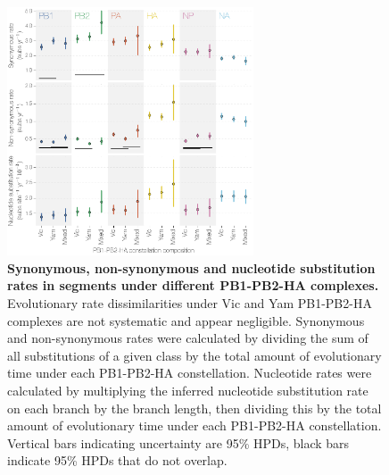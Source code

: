 \documentclass[11pt,oneside,letterpaper]{article}
\begin{document}
\begin{figure}
\centering  
\includegraphics[width=0.65\textwidth]  {supp_figures/InfB_robustCounting.png}
\caption{\textbf{Synonymous, non-synonymous and nucleotide substitution rates in segments under different PB1-PB2-HA complexes.}
Evolutionary rate dissimilarities under Vic and Yam PB1-PB2-HA complexes are not systematic and appear negligible.
Synonymous and non-synonymous rates were calculated by dividing the sum of all substitutions of a given class by the total amount of evolutionary time under each PB1-PB2-HA constellation.
Nucleotide rates were calculated by multiplying the inferred nucleotide substitution rate on each branch by the branch length, then dividing this by the total amount of evolutionary time under each PB1-PB2-HA constellation.
Vertical bars indicating uncertainty are 95\% HPDs, black bars indicate 95\% HPDs that do not overlap.}
\label{robustCounting}
\end{figure}

\end{document}
